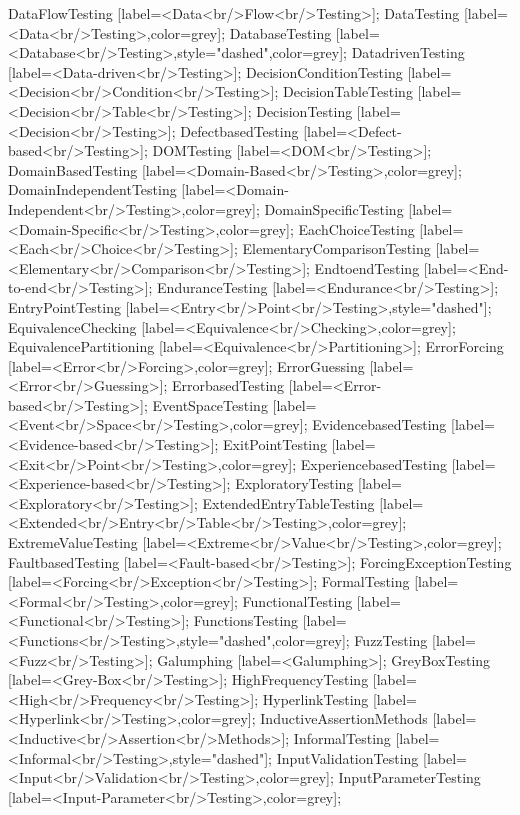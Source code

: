 \documentclass{article}
\begin{document}
{DataFlowTesting [label=<Data<br/>Flow<br/>Testing>];
DataTesting [label=<Data<br/>Testing>,color=grey];
DatabaseTesting [label=<Database<br/>Testing>,style="dashed",color=grey];
DatadrivenTesting [label=<Data-driven<br/>Testing>];
DecisionConditionTesting [label=<Decision<br/>Condition<br/>Testing>];
DecisionTableTesting [label=<Decision<br/>Table<br/>Testing>];
DecisionTesting [label=<Decision<br/>Testing>];
DefectbasedTesting [label=<Defect-based<br/>Testing>];
DOMTesting [label=<DOM<br/>Testing>];
DomainBasedTesting [label=<Domain-Based<br/>Testing>,color=grey];
DomainIndependentTesting [label=<Domain-Independent<br/>Testing>,color=grey];
DomainSpecificTesting [label=<Domain-Specific<br/>Testing>,color=grey];
EachChoiceTesting [label=<Each<br/>Choice<br/>Testing>];
ElementaryComparisonTesting [label=<Elementary<br/>Comparison<br/>Testing>];
EndtoendTesting [label=<End-to-end<br/>Testing>];
EnduranceTesting [label=<Endurance<br/>Testing>];
EntryPointTesting [label=<Entry<br/>Point<br/>Testing>,style="dashed"];
EquivalenceChecking [label=<Equivalence<br/>Checking>,color=grey];
EquivalencePartitioning [label=<Equivalence<br/>Partitioning>];
ErrorForcing [label=<Error<br/>Forcing>,color=grey];
ErrorGuessing [label=<Error<br/>Guessing>];
ErrorbasedTesting [label=<Error-based<br/>Testing>];
EventSpaceTesting [label=<Event<br/>Space<br/>Testing>,color=grey];
EvidencebasedTesting [label=<Evidence-based<br/>Testing>];
ExitPointTesting [label=<Exit<br/>Point<br/>Testing>,color=grey];
ExperiencebasedTesting [label=<Experience-based<br/>Testing>];
ExploratoryTesting [label=<Exploratory<br/>Testing>];
ExtendedEntryTableTesting [label=<Extended<br/>Entry<br/>Table<br/>Testing>,color=grey];
ExtremeValueTesting [label=<Extreme<br/>Value<br/>Testing>,color=grey];
FaultbasedTesting [label=<Fault-based<br/>Testing>];
ForcingExceptionTesting [label=<Forcing<br/>Exception<br/>Testing>];
FormalTesting [label=<Formal<br/>Testing>,color=grey];
FunctionalTesting [label=<Functional<br/>Testing>];
FunctionsTesting [label=<Functions<br/>Testing>,style="dashed",color=grey];
FuzzTesting [label=<Fuzz<br/>Testing>];
Galumphing [label=<Galumphing>];
GreyBoxTesting [label=<Grey-Box<br/>Testing>];
HighFrequencyTesting [label=<High<br/>Frequency<br/>Testing>];
HyperlinkTesting [label=<Hyperlink<br/>Testing>,color=grey];
InductiveAssertionMethods [label=<Inductive<br/>Assertion<br/>Methods>];
InformalTesting [label=<Informal<br/>Testing>,style="dashed"];
InputValidationTesting [label=<Input<br/>Validation<br/>Testing>,color=grey];
InputParameterTesting [label=<Input-Parameter<br/>Testing>,color=grey];
}
\end{document}
